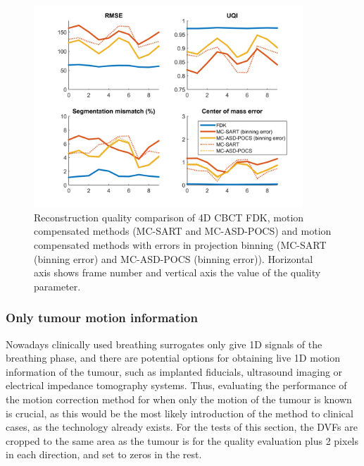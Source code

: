 \begin{figure}
\begin{center}

\includegraphics[width=0.9\textwidth]{accuracyMC/binningMCCBCTparams.png} 


\end{center}

\caption[Reconstruction quality comparison of motion compensation]{\label{fig:binMCCBCTquality}  Reconstruction quality comparison of 4D CBCT FDK, motion compensated methods (MC-SART and MC-ASD-POCS) and motion compensated methods with errors in projection binning (MC-SART (binning error) and MC-ASD-POCS (binning error)). Horizontal axis shows frame number and vertical axis the value of the quality parameter.} 
\end{figure}



\subsubsection{Only tumour motion information}

Nowadays clinically used breathing surrogates only give 1D signals of the breathing phase, and there are potential options for obtaining live 1D motion information of the tumour, such as implanted fiducials, ultrasound imaging\cite{western2015ultrasound} or electrical impedance tomography\cite{song2009non}\cite{pengpan2010motion} systems. Thus, evaluating the performance of the motion correction method for when only the motion of the tumour is known is crucial, as this would be the most likely introduction of the method to clinical cases, as the technology already exists. For the tests of this section, the DVFs are cropped to the same area as the tumour is for the quality evaluation plus 2 pixels in each direction, and set to zeros in the rest.

